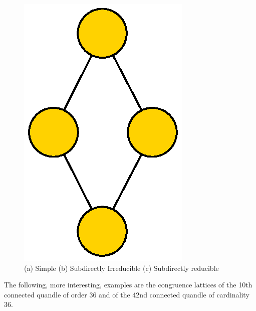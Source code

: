 \documentclass{mcom-l}
\begin{document}
\begin{figure}[H]
\includegraphics[scale=0.6]{Thesis/images/Coloured28_2LatticeGraph.eps}\hfill

\caption{(a) Simple (b) Subdirectly Irreducible (c) Subdirectly reducible}
\label{fig:conglattice}

\end{figure}
\noindent The following, more interesting, examples are the congruence lattices of the 10th connected quandle of order 36 and of the 42nd connected quandle of cardinality 36.
\end{document}
